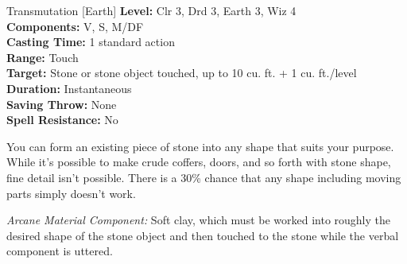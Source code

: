 {Transmutation [Earth]}
{
	\textbf{Level:}
	Clr 3, Drd 3, Earth 3, Wiz 4\\
	\textbf{Components:}
	V, S, M/DF\\
	\textbf{Casting Time:}
	1 standard action\\
	\textbf{Range:}
	Touch\\
	\textbf{Target:}
	Stone or stone object touched, up to 10 cu. ft. + 1 cu. ft./level\\
	\textbf{Duration:}
	Instantaneous\\
	\textbf{Saving Throw:}
	None\\
	\textbf{Spell Resistance:}
	No\\
}
{
	You can form an existing piece of stone into any shape that suits your purpose. While it's possible to make crude coffers, doors, and so forth with stone shape, fine detail isn't possible. There is a 30\% chance that any shape including moving parts simply doesn't work.

	\textit{Arcane Material Component:}
	Soft clay, which must be worked into roughly the desired shape of the stone object and then touched to the stone while the verbal component is uttered.

}
